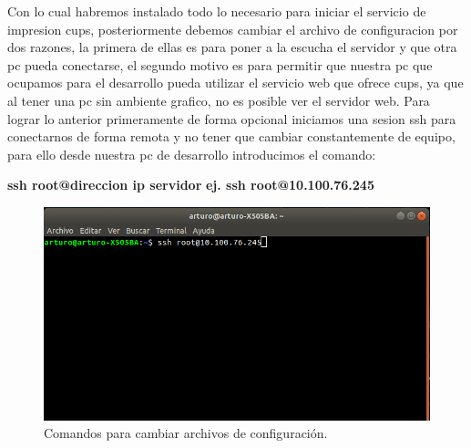 Con lo cual habremos instalado todo lo necesario para iniciar el servicio de impresion cups, posteriormente debemos cambiar el archivo de configuracion por dos razones, la primera de ellas es para poner a la escucha el servidor y que otra pc pueda conectarse, el segundo motivo es para permitir que nuestra pc que ocupamos para el desarrollo pueda utilizar el servicio web que ofrece cups, ya que al tener una pc sin ambiente grafico, no es posible ver el servidor web. Para lograr lo anterior primeramente de forma opcional iniciamos una sesion ssh para conectarnos de forma remota y no tener que cambiar constantemente de equipo, para ello desde nuestra pc de desarrollo introducimos el comando:
\\
\begin{center}
\textbf{ssh root@direccion ip servidor}
\textbf{ej. ssh root@10.100.76.245}
\end {center}
\FloatBarrier
\begin{figure}[htbp!]
		\centering
			\includegraphics[width=.9\textwidth]{images/r2}
		\caption{Comandos para cambiar archivos de configuración.}
		\label{image:r2}
\end{figure}
\FloatBarrier

